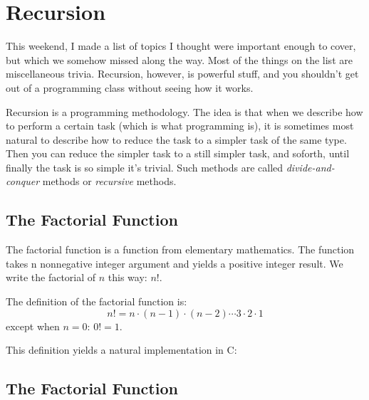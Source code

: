 \section{Recursion}

    This weekend, I made a list of topics I thought were important
enough to cover, but which we somehow missed along the way.  Most of the
things on the list are miscellaneous trivia. Recursion, however, is
powerful stuff, and you shouldn't get out of a programming class without
seeing how it works.

Recursion is a programming methodology.  The idea is that when we
describe how to perform a certain task (which is what programming is),
it is sometimes most natural to describe how to reduce the task to a
simpler task of the same type.  Then you can reduce the simpler task to
a still simpler task, and soforth, until finally the task is so simple
it's trivial.  Such methods are called {\em divide-and-conquer}\/
methods or {\em recursive}\/ methods.

\subsection{The Factorial Function}

The factorial function is a function from elementary mathematics.  The
function takes n nonnegative integer argument and yields a positive
integer result.  We write the factorial of $n$ this way:  $n!$.  

The definition of the factorial function is: \[ n! = n \cdot (n-1) \cdot
(n-2) \cdots 3\cdot 2\cdot 1\] except when $n=0$:  $0! = 1$.

This definition yields a natural implementation in C:

\begin{flushleft}
\verb% long int fact(unsigned int n) % \\*
\verb% { % \\*
\verb%   long int total = 1; % \\*
\verb%  % \\*
\verb%   while (n>1)  % \\*
\verb%     total *= n--; % \\*
\verb%  % \\*
\verb%   return total; % \\*
\verb% } % 
\end{flushleft}

\subsection{The Factorial Function}

